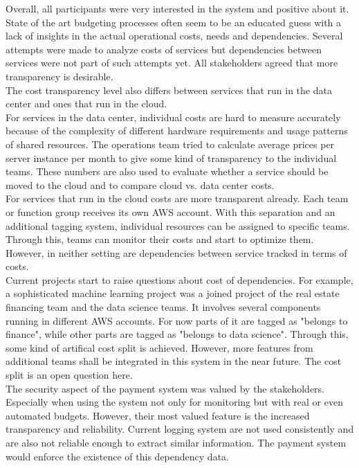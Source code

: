 \documentclass[a4paper,12pt]{scrartcl}
\begin{document}
Overall, all participants were very interested in the system and positive about it. State of the art budgeting processes often seem to be an educated guess with a lack of insights in the actual operational costs, needs and dependencies. Several attempts were made to analyze costs of services but dependencies between services were not part of such attempts yet. All stakeholders agreed that more transparency is desirable.\\

The cost transparency level also differs between services that run in the data center and ones that run in the cloud.\\
For services in the data center, individual costs are hard to measure accurately because of the complexity of different hardware requirements and usage patterns of shared resources. The operations team tried to calculate average prices per server instance per month to give some kind of transparency to the individual teams. These numbers are also used to evaluate whether a service should be moved to the cloud and to compare cloud vs. data center costs.\\
For services that run in the cloud costs are more transparent already. Each team or function group receives its own AWS account. With this separation and an additional tagging system, individual resources can be assigned to specific teams. Through this, teams can monitor their costs and start to optimize them.\\
However, in neither setting are dependencies between service tracked in terms of costs.\\

Current projects start to raise questions about cost of dependencies. For example, a sophisticated machine learning project was a joined project of the real estate financing team and the data science teams. It involves several components running in different AWS accounts. For now parts of it are tagged as "belongs to finance", while other parts are tagged as "belongs to data science". Through this, some kind of artifical cost split is achieved. However, more features from additional teams shall be integrated in this system in the near future. The cost split is an open question here.\\

The security aspect of the payment system was valued by the stakeholders. Especially when using the system not only for monitoring but with real or even automated budgets. However, their most valued feature is the increased transparency and reliability. Current logging system are not used consistently and are also not reliable enough to extract similar information. The payment system would enforce the existence of this dependency data.\\
\end{document}
